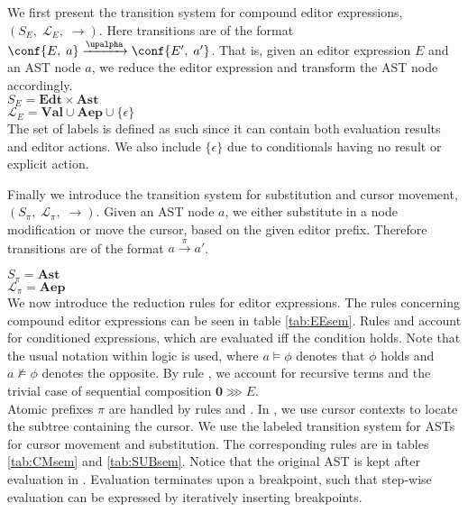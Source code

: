 We first present the transition system for compound editor expressions, $\left(S_E,\; \mathcal{L}_E,\; \rightarrow \right)$. Here transitions are of the format $\conf{E,\;a} \xrightarrow{\upalpha} \conf{E',\;a'}$. That is, given an editor expression $E$ and an AST node $a$, we reduce the editor expression and transform the AST node accordingly.\\

$S_E = \mathbf{Edt} \times \mathbf{Ast}$ \\
$\mathcal{L}_E = \mathbf{Val} \cup \mathbf{Aep} \cup \{\epsilon\}$ \\

The set of labels is defined as such since it can contain both evaluation results and editor actions. We also include $\{\epsilon\}$ due to conditionals having no result or explicit action.\\

\begin{sloppypar}
Finally we introduce the transition system for substitution and cursor movement, $\left(S_\pi,\; \mathcal{L}_\pi,\; \rightarrow \right)$. Given an AST node $a$, we either substitute in a node modification or move the cursor, based on the given editor prefix. Therefore transitions are of the format $a \xrightarrow{\pi} a'$.\\
\end{sloppypar}

$S_\pi = \mathbf{Ast}$ \\
$\mathcal{L}_\pi = \mathbf{Aep}$\\
%

We now introduce the reduction rules for editor expressions. The rules concerning compound editor expressions can be seen in table \ref{tab:EEsem}. Rules  and  account for conditioned expressions, which are evaluated iff the condition holds. Note that the usual notation within logic is used, where $a \vDash \phi$ denotes that $\phi$ holds and $a \nvDash \phi$ denotes the opposite. By rule , we account for recursive terms and the trivial case of sequential composition $\mathbf{0} \ggg E$.\\

Atomic prefixes $\pi$ are handled by rules  and . In , we use cursor contexts to locate the subtree containing the cursor. We use the labeled transition system for ASTs for cursor movement and substitution. The corresponding rules are in tables \ref{tab:CMsem} and \ref{tab:SUBsem}. Notice that the original AST is kept after evaluation in . Evaluation terminates upon a breakpoint, such that step-wise evaluation can be expressed by iteratively inserting breakpoints.
\vspace*{-0.8cm}

